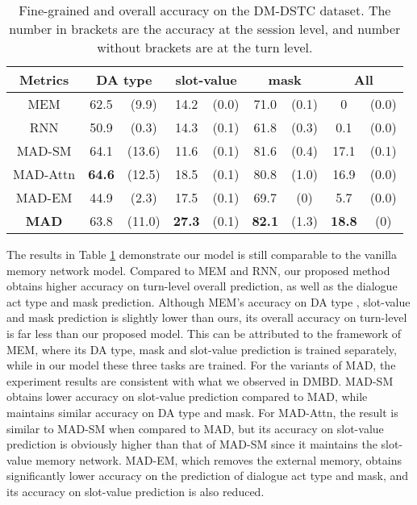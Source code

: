 \begin{table}[htbp]
\small
\begin{center}
\begin{tabular}{ c | c c | c c | c c | c c}
  \hline
    Metrics & \multicolumn{2}{c|}{DA type} & \multicolumn{2}{c|}{slot-value} & \multicolumn{2}{c|}{mask} & \multicolumn{2}{c}{All}\\
  \hline
    MEM & 62.5 & (9.9) & 14.2 & (0.0) & 71.0 & (0.1) & 0 & (0.0)\\   
    RNN & 50.9 & (0.3) & 14.3 & (0.1) & 61.8 & (0.3) & 0.1 & (0.0) \\
    MAD-SM & 64.1 & (13.6) & 11.6 & (0.1) & 81.6 & (0.4) & 17.1 & (0.1)\\
    MAD-Attn & {\bf 64.6} & (12.5) & 18.5 & (0.1) & 80.8 & (1.0) & 16.9 & (0.0)\\
    MAD-EM & 44.9 & (2.3) & 17.5 & (0.1) & 69.7 & (0) & 5.7 & (0.0)\\
  \hline
    {\bf MAD} & 63.8 & (11.0) & {\bf 27.3} & (0.1) & {\bf 82.1} & (1.3) & {\bf 18.8} & (0)\\ %
  \hline
\end{tabular}
\end{center}
\caption{\label{tab:dstc}Fine-grained and overall accuracy on the DM-DSTC dataset. The number in brackets are the accuracy at the session level, and number without brackets are at the turn level.}
\end{table}




The results in Table \ref{tab:dstc} demonstrate our model is still comparable to the vanilla memory network model. Compared to MEM and RNN, our proposed method obtains higher accuracy on turn-level overall prediction, as well as the dialogue act type and mask prediction.
Although MEM's accuracy on DA type , slot-value and mask prediction is slightly lower than ours, its overall accuracy on turn-level is far less than our proposed model. This can be attributed to the framework of MEM, where its DA type, mask and slot-value prediction is trained separately, while in our model these three tasks are trained.
For the variants of MAD, the experiment results are consistent with what we observed in DMBD. MAD-SM obtains lower accuracy on slot-value prediction compared to MAD, while maintains similar accuracy on DA type and mask. For MAD-Attn, the result is similar to MAD-SM when compared to MAD, but its accuracy on slot-value prediction is obviously higher than that of MAD-SM since it maintains the slot-value memory network. MAD-EM, which removes the external memory, obtains significantly lower accuracy on the prediction of dialogue act type and mask, and its accuracy on slot-value prediction is also reduced.

